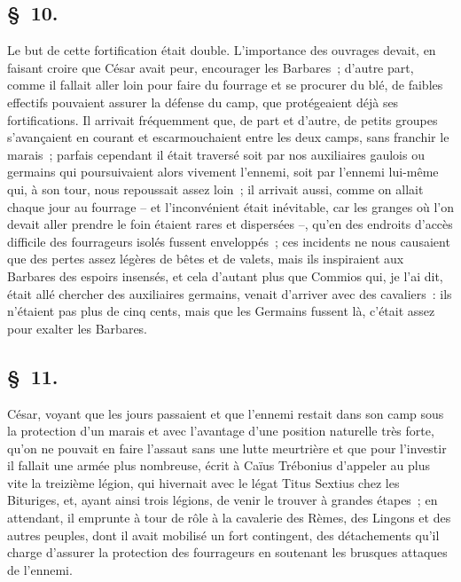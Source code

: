 \documentclass[french,twoside]{book} %
\begin{document}
\subsection[{§ 10.}]{ \textsc{§ 10.} }
\noindent Le but de cette fortification était double. L'importance des ouvrages devait, en faisant croire que César avait peur, encourager les Barbares ; d’autre part, comme il fallait aller loin pour faire du fourrage et se procurer du blé, de faibles effectifs pouvaient assurer la défense du camp, que protégeaient déjà ses fortifications. Il arrivait fréquemment que, de part et d’autre, de petits groupes s’avançaient en courant et escarmouchaient entre les deux camps, sans franchir le marais ; parfais cependant il était traversé soit par nos auxiliaires gaulois ou germains qui poursuivaient alors vivement l’ennemi, soit par l’ennemi lui-même qui, à son tour, nous repoussait assez loin ; il arrivait aussi, comme on allait chaque jour au fourrage – et l’inconvénient était inévitable, car les granges où l’on devait aller prendre le foin étaient rares et dispersées –, qu’en des endroits d’accès difficile des fourrageurs isolés fussent enveloppés ; ces incidents ne nous causaient que des pertes assez légères de bêtes et de valets, mais ils inspiraient aux Barbares des espoirs insensés, et cela d’autant plus que Commios qui, je l’ai dit, était allé chercher des auxiliaires germains, venait d’arriver avec des cavaliers : ils n’étaient pas plus de cinq cents, mais que les Germains fussent là, c’était assez pour exalter les Barbares.
\subsection[{§ 11.}]{ \textsc{§ 11.} }
\noindent César, voyant que les jours passaient et que l’ennemi restait dans son camp sous la protection d’un marais et avec l’avantage d’une position naturelle très forte, qu’on ne pouvait en faire l’assaut sans une lutte meurtrière et que pour l’investir il fallait une armée plus nombreuse, écrit à Caïus Trébonius d’appeler au plus vite la treizième légion, qui hivernait avec le légat Titus Sextius chez les Bituriges, et, ayant ainsi trois légions, de venir le trouver à grandes étapes ; en attendant, il emprunte à tour de rôle à la cavalerie des Rèmes, des Lingons et des autres peuples, dont il avait mobilisé un fort contingent, des détachements qu’il charge d’assurer la protection des fourrageurs en soutenant les brusques attaques de l’ennemi.
\end{document}
